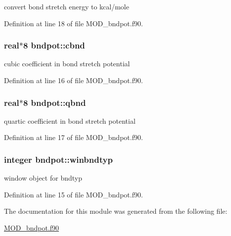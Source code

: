 convert bond stretch energy to kcal/mole 



Definition at line 18 of file M\-O\-D\-\_\-bndpot.\-f90.

\hypertarget{classbndpot_af054ed3046fa7c103ad7183539e5fc5a}{
\subsubsection[{cbnd}]{\setlength{\rightskip}{0pt plus 5cm}real$\ast$8 bndpot\-::cbnd}}\label{classbndpot_af054ed3046fa7c103ad7183539e5fc5a}


cubic coefficient in bond stretch potential 



Definition at line 16 of file M\-O\-D\-\_\-bndpot.\-f90.

\hypertarget{classbndpot_aca00517c3b6a2703d6b02b147b0a5459}{
\subsubsection[{qbnd}]{\setlength{\rightskip}{0pt plus 5cm}real$\ast$8 bndpot\-::qbnd}}\label{classbndpot_aca00517c3b6a2703d6b02b147b0a5459}


quartic coefficient in bond stretch potential 



Definition at line 17 of file M\-O\-D\-\_\-bndpot.\-f90.

\hypertarget{classbndpot_a657e334a35d5639333efbf4e1dc5e580}{
\subsubsection[{winbndtyp}]{\setlength{\rightskip}{0pt plus 5cm}integer bndpot\-::winbndtyp}}\label{classbndpot_a657e334a35d5639333efbf4e1dc5e580}


window object for bndtyp 



Definition at line 15 of file M\-O\-D\-\_\-bndpot.\-f90.



The documentation for this module was generated from the following file\-:\begin{DoxyCompactItemize}
\item 
\hyperlink{MOD__bndpot_8f90}{M\-O\-D\-\_\-bndpot.\-f90}\end{DoxyCompactItemize}
